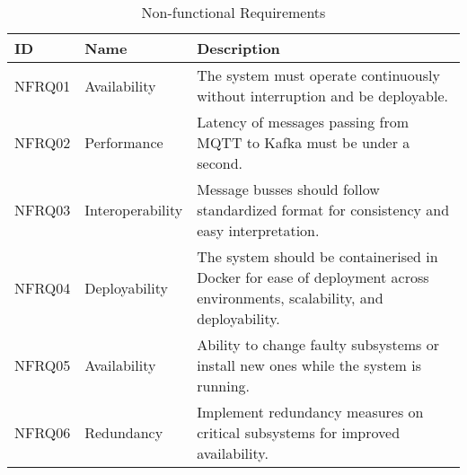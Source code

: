 \begin{table}[h]
    \caption{Non-functional Requirements}
    \label{tab:nonFunctionalReq}
    \centering
    \begin{tabular}{|l|l|p{4cm}|}
        \hline
        ID & Name & Description \\
        \hline
        NFRQ01 & Availability   & The system must operate continuously without interruption and be deployable.     \\
        \hline
        NFRQ02 & Performance          & Latency of messages passing from MQTT to Kafka must be under a second.  \\
        \hline
        NFRQ03 & Interoperability      & Message busses should follow standardized format for consistency and easy interpretation.   \\
        \hline
        NFRQ04 & Deployability        & The system should be containerised in Docker for ease of deployment across environments, scalability, and deployability.  \\
        \hline
        NFRQ05 & Availability     & Ability to change faulty subsystems or install new ones while the system is running.   \\
        \hline
        NFRQ06 & Redundancy           & Implement redundancy measures on critical subsystems for improved availability.  \\
        \hline
    \end{tabular}
\end{table}